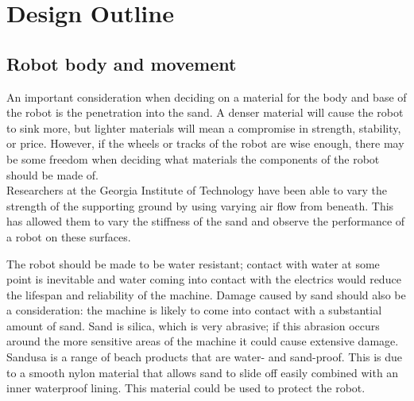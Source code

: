 

\chapter{Design Outline}\label{design outline}\label{section \thechapter}

\label{outline: aims and motivations}


\section{Robot body and movement}\label{outline: body and movement}

        An important consideration when deciding on a material for the body and base of the robot is the penetration into the sand. A denser material will cause the robot to sink more, but lighter materials will mean a compromise in strength, stability, or price. However, if the wheels or tracks of the robot are wise enough, there may be some freedom when deciding what materials the components of the robot should be made of.\\
        Researchers at the Georgia Institute of Technology have been able to vary the strength of the supporting ground by using varying air flow from beneath.\cite{Qian} This has allowed them to vary the stiffness of the sand and observe the performance of a robot on these surfaces.

        The robot should be made to be water resistant; contact with water at some point is inevitable and water coming into contact with the electrics would reduce the lifespan and reliability of the machine. Damage caused by sand should also be a consideration: the machine is likely to come into contact with a substantial amount of sand. Sand is silica, which is very abrasive; if this abrasion occurs around the more sensitive areas of the machine it could cause extensive damage. Sandusa is a range of beach products that are water- and sand-proof.\cite{sandusa} This is due to a smooth nylon material that allows sand to slide off easily combined with an inner waterproof lining. This material could be used to protect the robot.


